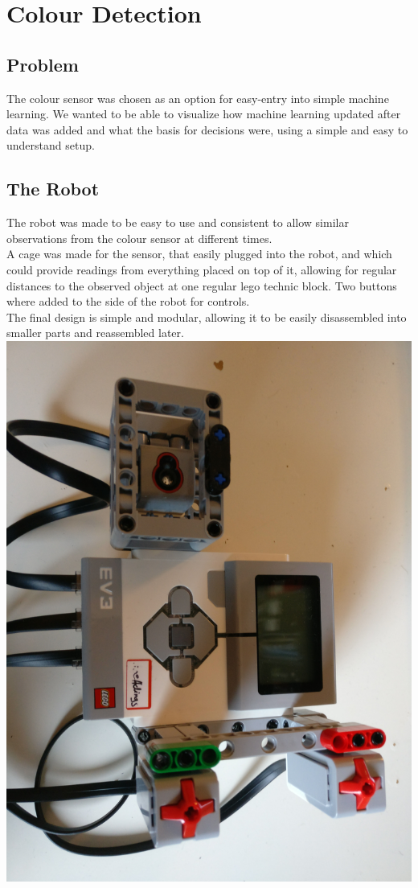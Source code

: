 \documentclass[11pt, a4paper]{article}
\begin{document}
\pagebreak
\section{Colour Detection}
\subsection{Problem}
The colour sensor was chosen as an option for easy-entry into simple machine learning. We wanted to be able to visualize how machine learning updated after data was added and what the basis for decisions were, using a simple and easy to understand setup.
\subsection{The Robot}
The robot was made to be easy to use and consistent to allow similar observations from the colour sensor at different times. \\
A cage was made for the sensor, that easily plugged into the robot, and which could provide readings from everything placed on top of it, allowing for regular distances to the observed object at one regular lego technic block. Two buttons where added to the side of the robot for controls. \\
The final design is simple and modular, allowing it to be easily disassembled into smaller parts and reassembled later. \\
\includegraphics[scale=0.1,angle=90]{images/colour_robot_full.jpg} \\
\end{document}
